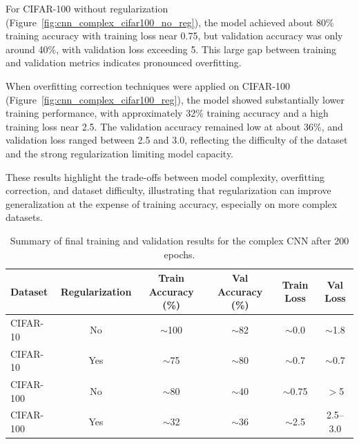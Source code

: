 \documentclass[journal,article,submit,pdftex,moreauthors]{Definitions/mdpi}
\begin{document}
For CIFAR-100 without regularization (Figure~\ref{fig:cnn_complex_cifar100_no_reg}), the model achieved about 80\% training accuracy with training loss near 0.75, but validation accuracy was only around 40\%, with validation loss exceeding 5. This large gap between training and validation metrics indicates pronounced overfitting.

When overfitting correction techniques were applied on CIFAR-100 (Figure~\ref{fig:cnn_complex_cifar100_reg}), the model showed substantially lower training performance, with approximately 32\% training accuracy and a high training loss near 2.5. The validation accuracy remained low at about 36\%, and validation loss ranged between 2.5 and 3.0, reflecting the difficulty of the dataset and the strong regularization limiting model capacity.

These results highlight the trade-offs between model complexity, overfitting correction, and dataset difficulty, illustrating that regularization can improve generalization at the expense of training accuracy, especially on more complex datasets.

\begin{table}[H]
\caption{Summary of final training and validation results for the complex CNN after 200 epochs.\label{tab:complex_cnn_summary}}
\centering
\begin{tabularx}{\textwidth}{lCCCCC}
\toprule
\textbf{Dataset} & \textbf{Regularization} & \textbf{Train Accuracy (\%)} & \textbf{Val Accuracy (\%)} & \textbf{Train Loss} & \textbf{Val Loss} \\
\midrule
CIFAR-10  & No  & $\sim$100 & $\sim$82  & $\sim$0.0 & $\sim$1.8 \\
CIFAR-10  & Yes & $\sim$75  & $\sim$80  & $\sim$0.7 & $\sim$0.7 \\
CIFAR-100 & No  & $\sim$80  & $\sim$40  & $\sim$0.75& $>$5 \\
CIFAR-100 & Yes & $\sim$32  & $\sim$36  & $\sim$2.5 & 2.5--3.0 \\
\bottomrule
\end{tabularx}
\end{table}
\end{document}
